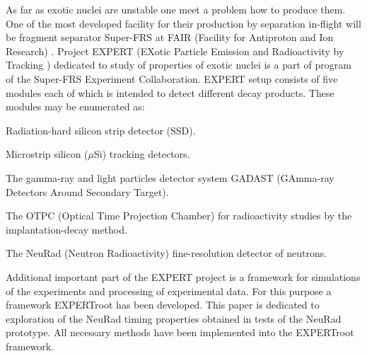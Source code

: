 \documentclass{webofc}
\begin{document}
As far as exotic nuclei are unstable one meet a problem how to produce them.
One of the most developed facility for their production by separation in-flight will be fragment separator Super-FRS at FAIR (Facility for Antiproton and Ion Research) \cite{diplom}. Project EXPERT (EXotic Particle Emission and Radioactivity by Tracking \cite{IMexpert}) dedicated to study of properties of exotic nuclei is a part of program of the Super-FRS Experiment Collaboration. EXPERT setup consists of five modules each of which is intended to detect different decay products.
These modules may be enumerated as:
\begin{inparaenum}[(i)]
	\item Radiation-hard silicon strip detector (SSD).
	\item Microstrip silicon ($\mu$Si) tracking detectors.
	\item The gamma-ray and light particles detector system GADAST (GAmma-ray Detectors Around Secondary Target).
	\item The OTPC (Optical Time Projection Chamber) for radioactivity studies by the implantation-decay method.
	\item The NeuRad (Neutron Radioactivity) fine-resolution detector of neutrons.
\end{inparaenum}

Additional important part of the EXPERT project is a framework for simulations of the experiments and processing of experimental data. For this purpose a framework EXPERTroot \cite{er} has been developed.
This paper is dedicated to exploration of the NeuRad timing properties obtained in tests of the NeuRad prototype. All necessary methods have been implemented into the EXPERTroot framework.
\end{document}
